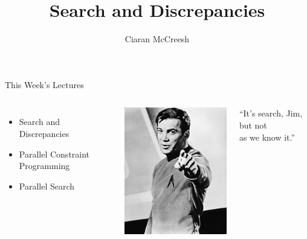 \documentclass{beamer}
\title{Search and Discrepancies}
\author[Ciaran McCreesh]{\textcolor{uofgblue}{Ciaran McCreesh}}
\begin{document}
{
    \begin{frame}
        \titlepage
    \end{frame}
}

\begin{frame}{This Week's Lectures}
    \begin{columns}
        \begin{itemize}
            \item \textcolor{uofgblue}{Search and Discrepancies}
            \item Parallel Constraint Programming
            \item Parallel Search
        \end{itemize}
        \centering\includegraphics*[keepaspectratio=true,scale=0.5]{images/search-but-not-as-we-know-it.jpg}
        \begin{center}``It's search, Jim, but not\\as we know it.''\end{center}
    \end{columns}
\end{frame}
\end{document}
